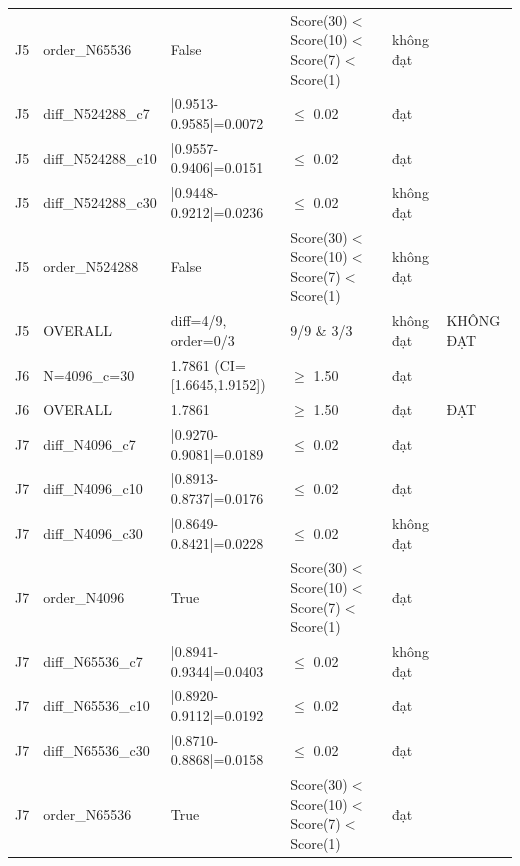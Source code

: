 \begin{longtable}{p{0.8cm}p{2.2cm}p{3.9cm}p{3.2cm}p{1.1cm}p{2.4cm}}
J5 & order\_\allowbreak{}N65536 & False & Score(30)$<$\allowbreak{}Score(10)$<$\allowbreak{}Score(7)$<$\allowbreak{}Score(1) & không đạt &  \\
J5 & diff\_\allowbreak{}N524288\_\allowbreak{}c7 & |0.9513-0.9585|=\allowbreak{}0.0072 & $\le$\allowbreak{} 0.02 & đạt &  \\
J5 & diff\_\allowbreak{}N524288\_\allowbreak{}c10 & |0.9557-0.9406|=\allowbreak{}0.0151 & $\le$\allowbreak{} 0.02 & đạt &  \\
J5 & diff\_\allowbreak{}N524288\_\allowbreak{}c30 & |0.9448-0.9212|=\allowbreak{}0.0236 & $\le$\allowbreak{} 0.02 & không đạt &  \\
J5 & order\_\allowbreak{}N524288 & False & Score(30)$<$\allowbreak{}Score(10)$<$\allowbreak{}Score(7)$<$\allowbreak{}Score(1) & không đạt &  \\
J5 & OVERALL & diff=\allowbreak{}4/9, order=\allowbreak{}0/3 & 9/9 \& 3/3 & không đạt & KHÔNG ĐẠT \\
J6 & N=\allowbreak{}4096\_\allowbreak{}c=\allowbreak{}30 & 1.7861 (CI=\allowbreak{}[1.6645,\allowbreak{}1.9152]) & $\ge$\allowbreak{} 1.50 & đạt &  \\
J6 & OVERALL & 1.7861 & $\ge$\allowbreak{} 1.50 & đạt & ĐẠT \\
J7 & diff\_\allowbreak{}N4096\_\allowbreak{}c7 & |0.9270-0.9081|=\allowbreak{}0.0189 & $\le$\allowbreak{} 0.02 & đạt &  \\
J7 & diff\_\allowbreak{}N4096\_\allowbreak{}c10 & |0.8913-0.8737|=\allowbreak{}0.0176 & $\le$\allowbreak{} 0.02 & đạt &  \\
J7 & diff\_\allowbreak{}N4096\_\allowbreak{}c30 & |0.8649-0.8421|=\allowbreak{}0.0228 & $\le$\allowbreak{} 0.02 & không đạt &  \\
J7 & order\_\allowbreak{}N4096 & True & Score(30)$<$\allowbreak{}Score(10)$<$\allowbreak{}Score(7)$<$\allowbreak{}Score(1) & đạt &  \\
J7 & diff\_\allowbreak{}N65536\_\allowbreak{}c7 & |0.8941-0.9344|=\allowbreak{}0.0403 & $\le$\allowbreak{} 0.02 & không đạt &  \\
J7 & diff\_\allowbreak{}N65536\_\allowbreak{}c10 & |0.8920-0.9112|=\allowbreak{}0.0192 & $\le$\allowbreak{} 0.02 & đạt &  \\
J7 & diff\_\allowbreak{}N65536\_\allowbreak{}c30 & |0.8710-0.8868|=\allowbreak{}0.0158 & $\le$\allowbreak{} 0.02 & đạt &  \\
J7 & order\_\allowbreak{}N65536 & True & Score(30)$<$\allowbreak{}Score(10)$<$\allowbreak{}Score(7)$<$\allowbreak{}Score(1) & đạt &  \\

\end{longtable}
